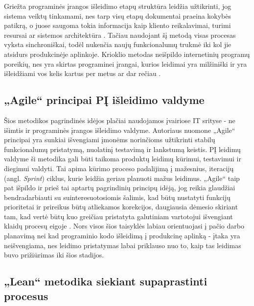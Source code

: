 \documentclass{VUMIFPSkursinis}
\begin{document}
Griežta programinės įrangos išleidimo etapų struktūra leidžia užtikrinti, jog sistema veiktų tinkamami, nes tarp visų etapų dokumentai praeina kokybės patikrą, o juose saugoma tokia informacija kaip kliento reikalavimai, turimi resursai ar sistemos architektūra \cite{SaltKetvirtas}. Tačiau naudojant šį metodą visas procesas vyksta sinchroniškai, todėl nukenčia naujų funkcionalumų trukmė iki kol jie atsidurs produkcinėje aplinkoje. Krioklio metodas neišpildo internetinių programų poreikių, nes yra skirtas programinei įrangai, kurios leidimai yra milžiniški ir yra išleidžiami vos kelis kartus per metus ar dar rečiau \cite{SaltTrecias}.

\subsection{„Agile“ principai PĮ išleidimo valdyme}

Šios metodikos pagrindinės idėjos plačiai naudojamos įvairiose IT srityse - ne išimtis ir programinės įrangos išleidimo valdyme. Autoriaus nuomone „Agile“ principai yra sunkiai išvengiami įmonėms norinčioms užtikrinti stabilų funkcionalumų pristatymą, nuolatinį testavimą ir lankstumą keistis. PĮ leidimų valdyme ši metodika gali būti taikoma produktų leidimų kūrimui, testavimui ir diegimui valdyti. Tai apima kūrimo proceso padalijimą į mažesnius, iteracijų (angl. \textit{Sprint}) ciklus, kurie leidžia geriau planuoti mažus leidimus. „Agile“ taip pat išpildo ir prieš tai aptartų pagrindinių principų idėją, jog reikia glaudžiai bendradarbiauti su suinteresuotosiomis šalimis, kad būtų nustatyti funkcijų prioritetai ir prireikus būtų atliekamos korekcijos, daugiausia dėmesio skiriant tam, kad vertė būtų kuo greičiau pristatyta galutiniam vartotojui išvengiant klaidų procesų eigoje \cite{SaltTrecias}. Nors visos šios taisyklės labiau orientuojasi į pačio darbo planavimą nei kad programinio kodo išleidimą į produkcinę aplinką - įtaka yra neišvengiama, nes leidimo pristatymas labai priklauso nuo to, kaip tas leidimas buvo prižiūrimas iki šios stadijos.

\subsection{„Lean“ metodika siekiant supaprastinti procesus}
\end{document}
